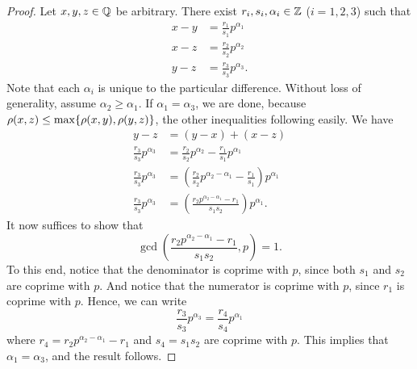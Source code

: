 \begin{proof}
    Let $x, y, z \in \mathbb{Q}$ be arbitrary. There exist $r_i, s_i, \alpha_i \in \mathbb{Z}$
    ($i = 1, 2, 3$) such that
    \begin{align*}
        x - y &= \frac{r_1}{s_1} p^{\alpha_1} \\
        x - z &= \frac{r_2}{s_2} p^{\alpha_2} \\
        y - z &= \frac{r_3}{s_3} p^{\alpha_3}.
    \end{align*}
    Note that each $\alpha_i$ is unique to the particular difference.
    Without loss of generality, assume $\alpha_2 \geq \alpha_1$. If $\alpha_1 =
    \alpha_3$, we are done, because $\rho(x,z) \leq \max\{\rho(x,y), \rho(y,z)\}$,
    the other inequalities following easily. We have
    \begin{align*}
        y - z &= (y - x) + (x - z) \\
        \frac{r_3}{s_3}p^{\alpha_3} &= \frac{r_2}{s_2} p^{\alpha_2} -
        \frac{r_1}{s_1} p^{\alpha_1} \\
        \frac{r_3}{s_3}p^{\alpha_3} &= \left(\frac{r_2}{s_2} p^{\alpha_2 -
        \alpha_1} - \frac{r_1}{s_1} \right) p^{\alpha_1} \\
        \frac{r_3}{s_3}p^{\alpha_3} &= \left(\frac{r_2p^{\alpha_2 -
        \alpha_1} - r_1}{s_1s_2} \right) p^{\alpha_1}.
     \end{align*}
     It now suffices to show that 
     \[
         \gcd \left(\frac{r_2p^{\alpha_2 - \alpha_1} - r_1}{s_1s_2},
         p \right) = 1.
     \]
     To this end, notice that the denominator is coprime with $p$, since both
     $s_1$ and $s_2$ are coprime with $p$. And notice that the numerator is
     coprime with $p$, since $r_1$ is coprime with $p$. Hence, we can write
     \[
         \frac{r_3}{s_3}p^{\alpha_3} = \frac{r_4}{s_4} p^{\alpha_1}
     \]
     where $r_4 = r_2 p^{\alpha_2 - \alpha_1} - r_1$ and $s_4 = s_1 s_2$ are
     coprime with $p$. This implies that $\alpha_1 = \alpha_3$, and the result
     follows.
\end{proof}
